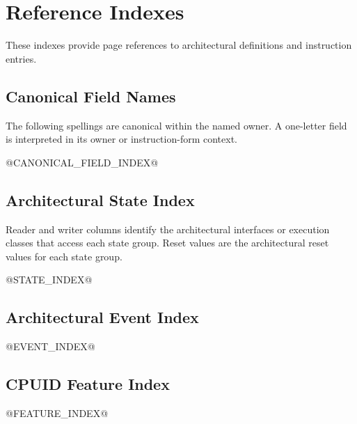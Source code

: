 \clearpage
\appendix
\section{Reference Indexes}\label{page:reference-indexes}\label{section:reference-indexes}

These indexes provide page references to architectural definitions and
instruction entries.

\subsection{Canonical Field Names}

The following spellings are canonical within the named owner. A one-letter field is interpreted in its owner or
instruction-form context.

@CANONICAL_FIELD_INDEX@

\subsection{Architectural State Index}

Reader and writer columns identify the architectural interfaces or execution classes that access each state group.
Reset values are the architectural reset values for each state group.

@STATE_INDEX@

\Needspace{2.2in}
\subsection{Architectural Event Index}

@EVENT_INDEX@

\subsection{CPUID Feature Index}

@FEATURE_INDEX@

